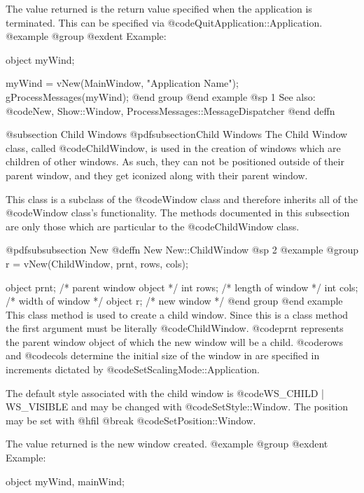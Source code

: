 The value returned is the return value specified when the application is
terminated.  This can be specified via @code{QuitApplication::Application}.
@example
@group
@exdent Example:

object  myWind;

myWind = vNew(MainWindow, "Application Name");
gProcessMessages(myWind);
@end group
@end example
@sp 1
See also:  @code{New, Show::Window, ProcessMessages::MessageDispatcher}
@end deffn











@subsection Child Windows
@pdfsubsection{Child Windows}
The Child Window class, called @code{ChildWindow}, is used in the creation
of windows which are children of other windows.  As such, they can not
be positioned outside of their parent window, and they get iconized along
with their parent window.


This class is a subclass of the @code{Window} class and therefore
inherits all of the @code{Window} class's functionality.  The methods
documented in this subsection are only those which are particular
to the @code{ChildWindow} class.





@pdfsubsubsection {New}
@deffn {New} New::ChildWindow
@sp 2
@example
@group
r = vNew(ChildWindow, prnt, rows, cols);

object  prnt;   /*  parent window object  */
int     rows;   /*  length of window      */
int     cols;   /*  width of window       */
object  r;      /*  new window            */
@end group
@end example
This class method is used to create a child window.
Since this is a class method the first argument must be literally
@code{ChildWindow}.  @code{prnt} represents the parent window
object of which the new window will be a child.  @code{rows} and
@code{cols} determine the initial size of the window in are specified
in increments dictated by @code{SetScalingMode::Application}.

The default style associated with the child window is
@code{WS_CHILD | WS_VISIBLE} and may be changed with @code{SetStyle::Window}.
The position may be set with @hfil @break @code{SetPosition::Window}.

The value returned is the new window created.
@example
@group
@exdent Example:

object  myWind, mainWind;

